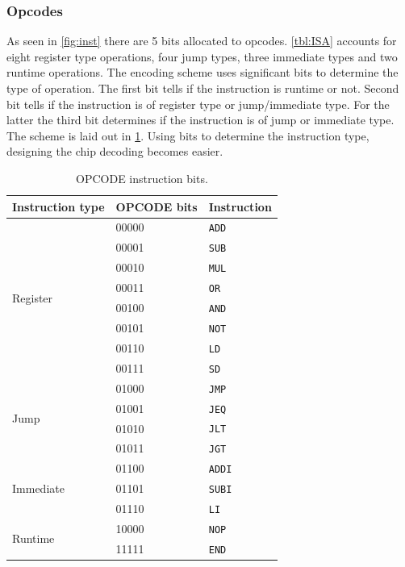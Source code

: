 \documentclass[a4paper, english]{article}
\numberwithin{equation}{section}
\begin{document}
\subsubsection{Opcodes}
As seen in \cref{fig:inst} there are 5 bits allocated to opcodes. \cref{tbl:ISA} accounts for eight register type operations, four jump types, three immediate types and two runtime operations. The encoding scheme uses significant bits to determine the type of operation. The first bit tells if the instruction is runtime or not. Second bit tells if the instruction is of register type or jump/immediate type. For the latter the third bit determines if the instruction is of jump or immediate type. The scheme is laid out in \cref{tbl:opcode}. Using bits to determine the instruction type, designing the chip decoding becomes easier.

\begin{table}[H]
    \centering
    \caption{OPCODE instruction bits.}\label{tbl:opcode}
    \begin{tabular}{lll}
        \toprule
        Instruction type           & OPCODE bits & Instruction   \\
        \midrule
        \multirow{8}{*}{Register}  & 00000       & \texttt{ADD}  \\
                                   & 00001       & \texttt{SUB}  \\
                                   & 00010       & \texttt{MUL}  \\
                                   & 00011       & \texttt{OR}   \\
                                   & 00100       & \texttt{AND}  \\
                                   & 00101       & \texttt{NOT}  \\
                                   & 00110       & \texttt{LD}   \\
                                   & 00111       & \texttt{SD}   \\
        \midrule
        \multirow{4}{*}{Jump}      & 01000       & \texttt{JMP}  \\
                                   & 01001       & \texttt{JEQ}  \\
                                   & 01010       & \texttt{JLT}  \\
                                   & 01011       & \texttt{JGT}  \\
        \midrule
        \multirow{3}{*}{Immediate} & 01100       & \texttt{ADDI} \\
                                   & 01101       & \texttt{SUBI} \\
                                   & 01110       & \texttt{LI}   \\
        \midrule
        \multirow{2}{*}{Runtime}   & 10000       & \texttt{NOP}  \\
                                   & 11111       & \texttt{END}  \\
        \bottomrule
    \end{tabular}
\end{table}
\end{document}

